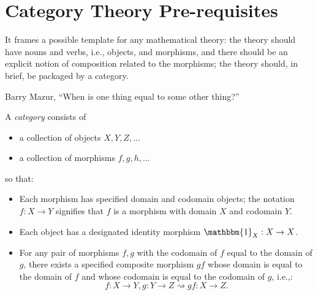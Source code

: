 \documentclass[11pt,reqno,oneside,a4paper]{article}
\begin{document}
\section{Category Theory Pre-requisites}
\epigraph{It frames a possible template for any
mathematical theory: the theory should have
nouns and verbs, i.e., objects, and morphisms,
and there should be an explicit notion of
composition related to the morphisms; the theory
should, in brief, be packaged by a category.}
{Barry Mazur, ``When is one thing equal to some
other thing?”}

\begin{defn}
	A \textit{category} consists of
	\begin{itemize}
		\item a collection of objects $X,Y,Z,\dots$
		\item a collection of morphisms $f,g,h,\dots$
	\end{itemize}
	so that:
	\begin{itemize}
		\item Each morphism has specified domain and codomain objects; the notation $f : X \to Y$
		signifies that $ f$ is a morphism with domain $X$ and codomain $Y$.
		\item Each object has a designated identity morphism $\mathbbm{1}_X : X \to X$.
		\item For any pair of morphisms $f,g$ with the codomain of $f$ equal to the domain of $g$, there exists a specified composite morphism $gf$ whose domain is equal to the domain of
		$f$ and whose codomain is equal to the codomain of $g$, i.e.,:
		$$f : X \to Y, g: Y \to Z \rightsquigarrow  g f : X \to Z .$$
	\end{itemize}
\end{defn}
\end{document}

